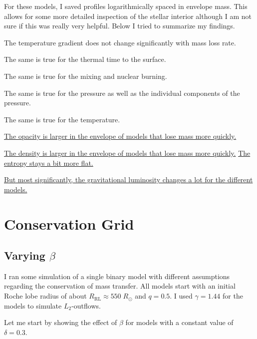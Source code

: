 \documentclass[a4paper,10pt]{article}
\begin{document}
For these models, I saved profiles logarithmically spaced in envelope mass. This allows for some more detailed inspection of the stellar interior although I am not sure if this was really very helpful. 
Below I tried to summarize my findings.

The temperature gradient does not change significantly with mass loss rate.

The same is true for the thermal time to the surface.

The same is true for the mixing and nuclear burning.

The same is true for the pressure as well as the individual components of the pressure.

The same is true for the temperature.

\href{https://s-koen.github.io/figures/#/plots/master-internship/w21/losing-envelope-opacity}{The opacity is larger in the envelope of models that lose mass more quickly.}

\href{https://s-koen.github.io/figures/#/plots/master-internship/w21/losing-envelope-density}{The density is larger in the envelope of models that lose mass more quickly.}
\href{https://s-koen.github.io/figures/#/plots/master-internship/w21/losing-envelope-entropy}{The entropy stays a bit more flat.}

\href{https://s-koen.github.io/figures/#/plots/master-internship/w21/losing-envelope-entropy}{But most significantly, the gravitational luminosity changes a lot for the different models.}

\section{Conservation Grid}

\subsection{Varying \texorpdfstring{\(\beta \)}{beta}}
I ran some simulation of a single binary model with different assumptions regarding the conservation of mass transfer. All models start with an initial Roche lobe radius of about \(R_\text{RL} \approx 550\;R_\odot\) and \(q=0.5\). I used \(\gamma =1.44\) for the models to simulate \(L_{2}\)-outflows.

Let me start by showing the effect of \(\beta \) for models with a constant value of \(\delta =0.3\).
\begin{figure}[ht]
    \centering
\end{figure}
\end{document}
